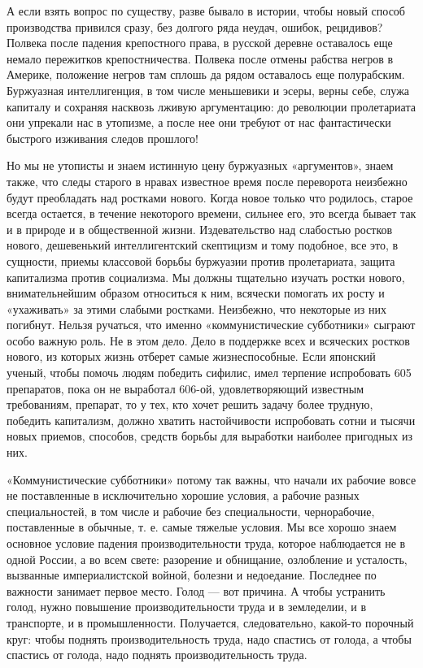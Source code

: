\documentclass[12pt]{article}
\newcommand{\parnum}{(\arabic{parcount})}
\newcounter{parcount}
\newenvironment{parnumbers}{%
  \par%
  \everypar{\noindent \stepcounter{parcount}\marginpar[]{\parnum}}%
}{}
\begin{document}
\begin{parnumbers}
А если взять вопрос по существу, разве бывало в истории, чтобы новый способ производства привился сразу, без долгого ряда неудач, ошибок, рецидивов? Полвека после падения крепостного права, в русской деревне оставалось еще немало пережитков крепостничества. Полвека после отмены рабства негров в Америке, положение негров там сплошь да рядом оставалось еще полурабским. Буржуазная интеллигенция, в том числе меньшевики и эсеры, верны себе, служа капиталу и сохраняя насквозь лживую аргументацию: до революции пролетариата они упрекали нас в утопизме, а после нее они требуют от нас фантастически быстрого изживания следов прошлого!

Но мы не утописты и знаем истинную цену буржуазных «аргументов», знаем также, что следы старого в нравах известное время после переворота неизбежно будут преобладать над ростками нового. Когда новое только что родилось, старое всегда остается, в течение некоторого времени, сильнее его, это всегда бывает так и в природе и в общественной жизни. Издевательство над слабостью ростков нового, дешевенький интеллигентский скептицизм и тому подобное, все это, в сущности, приемы классовой борьбы буржуазии против пролетариата, защита капитализма против социализма. Мы должны тщательно изучать ростки нового, внимательнейшим образом относиться к ним, всячески помогать их росту и «ухаживать» за этими слабыми ростками. Неизбежно, что некоторые из них погибнут. Нельзя ручаться, что именно «коммунистические субботники» сыграют особо важную роль. Не в этом дело. Дело в поддержке всех и всяческих ростков нового, из которых жизнь отберет самые жизнеспособные. Если японский ученый, чтобы помочь людям победить сифилис, имел терпение испробовать 605 препаратов, пока он не выработал 606-ой, удовлетворяющий известным требованиям, препарат, то у тех, кто хочет решить задачу более трудную, победить капитализм, должно хватить настойчивости испробовать сотни и тысячи новых приемов, способов, средств борьбы для выработки наиболее пригодных из них.

«Коммунистические субботники» потому так важны, что начали их рабочие вовсе не поставленные в исключительно хорошие условия, а рабочие разных специальностей, в том числе и рабочие без специальности, чернорабочие, поставленные в обычные, т. е. самые тяжелые условия. Мы все хорошо знаем основное условие падения производительности труда, которое наблюдается не в одной России, а во всем свете: разорение и обнищание, озлобление и усталость, вызванные империалистской войной, болезни и недоедание. Последнее по важности занимает первое место. Голод — вот причина. А чтобы устранить голод, нужно повышение производительности труда и в земледелии, и в транспорте, и в промышленности. Получается, следовательно, какой-то порочный круг: чтобы поднять производительность труда, надо спастись от голода, а чтобы спастись от голода, надо поднять производительность труда.


\end{parnumbers}
\end{document}
